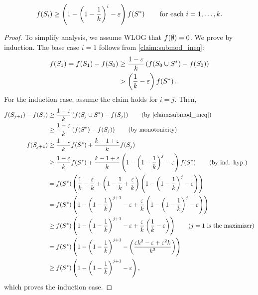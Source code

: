 \begin{claim}
    \begin{equation*}
        f \! \left( S_i \right) \geq \left( 1 - \left( 1 - \frac{1}{k} \right)^i - \varepsilon \right)f \! \left( S^{\ast} \right) \quad \quad 
        \textnormal{for each } i = 1, \ldots, k.
    \end{equation*}
    \label{claim:submod_ineq_induction}
\end{claim}
\begin{proof}
    To simplify analysis, we assume WLOG that $f \! \left( \emptyset \right) = 0$. We prove by induction. 
    The base case $i=1$ follows from \cref{claim:submod_ineq}:
    \begin{align*}
        f \! \left( S_1 \right) = f \! \left( S_1 \right) - f \! \left( S_0 \right) &\geq \frac{1 - \varepsilon}{k} \left( f \! \left( S_0 \cup  S^{\ast} \right) - f \! \left( S_0 \right) \right) 
        \\&> \left( \frac{1}{k} - \varepsilon \right) f \! \left( S^{\ast} \right). 
    \end{align*}
    For the induction case, assume the claim holds for $i = j$. Then, 
    \begin{align*}
        \f{S_{j+1}} - \f{S_j} &\geq \frac{1-\varepsilon}{k} \lrp{\f{S_j \cup  S^{\ast}} - \f{S_j}}
        \tag*{(by \cref{claim:submod_ineq})}\\
        &\geq \frac{1-\varepsilon}{k} \lrp{\f{S^{\ast}} - \f{S_j}}
        \tag*{(by monotonicity)}\\
        \f{S_{j+1}} &\geq \frac{1-\varepsilon}{k} \f{S^{\ast}} + \frac{k - 1 + \varepsilon}{k} \f{S_j}\\
        &\geq \frac{1-\varepsilon}{k} \f{S^{\ast}} + \frac{k-1+\varepsilon}{k}\lrp{1 - \lrp{1 - \frac{1}{k}}^j - \varepsilon} \f{S^{\ast}}
        \tag*{(by ind. hyp.)}\\ 
        &= \f{S^{\ast}} \lrp{\frac{1}{k} - \frac{\varepsilon}{k} + \lrp{1 - \frac{1}{k} + \frac{\varepsilon}{k}} \lrp{1 - \lrp{1 - \frac{1}{k}}^j - \varepsilon}} \\
        &= \f{S^{\ast}} \lrp{1 - \lrp{1 - \frac{1}{k}}^{j+1} -\varepsilon + \frac{\varepsilon}{k} \lrp{1 - \lrp{1 - \frac{1}{k}}^j - \varepsilon}} 
        \\
        &\geq \f{S^{\ast}} \lrp{1 - \lrp{1 - \frac{1}{k}}^{j+1} -\varepsilon + \frac{\varepsilon}{k} \lrp{\frac{1}{k} - \varepsilon}} 
        \tag*{($j = 1$ is the maximizer)}\\
        &= \f{S^{\ast}} \lrp{1 - \lrp{1 - \frac{1}{k}}^{j+1} - \lrp{\frac{\varepsilon k^2 - \varepsilon + \varepsilon^2 k}{k^2}}}
        \\ &\geq \f{S^{\ast}} \lrp{1 - \lrp{1 - \frac{1}{k}}^{j+1} - \varepsilon},
    \end{align*} 
    which proves the induction case. 
\end{proof}

